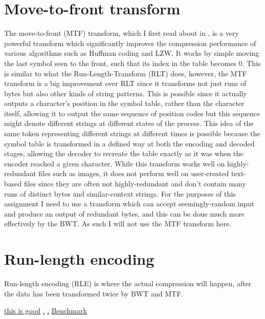 \documentclass[a4paper, 11pt]{article}
\numberwithin{equation}{section}
\theoremstyle{plain}
\theoremstyle{definition}
\begin{document}
\section{Move-to-front transform}
The move-to-front (MTF) transform, which I first read about in \cite{GoogleCompression}, 
is a very powerful transform which significantly improves the compression performance of 
various algorithms such as Huffman coding and LZW. 
It works by simple moving the last symbol seen to the front, such that its index in the table becomes 0. 
This is similar to what the Run-Length-Transform (RLT) does, however, the MTF transform 
is a big improvement over RLT since it transforms not just runs of bytes but also other kinds of 
string patterns. 
This is possible since it actually outputs a character's position in the symbol table, rather than the 
character itself, allowing it to output the same sequence of position codes but this sequence might denote 
different strings at different states of the process. 
This idea of the same token representing different strings at different times is possible because 
the symbol table is transformed in a defined way at both the encoding and decoded stages, allowing 
the decoder to recreate the table exactly as it was when the encoder reached a given character. 
While this transform works well on highly-redundant files such as images, 
it does not perform well on user-created text-based files since they are often not highly-redundant 
and don't contain many runs of distinct bytes and similar-context strings. 
For the purposes of this assignment I need to use a transform which can accept seemingly-random input 
and produce an output of redundant bytes, and this can be done much more effectively by the BWT. 
As such I will not use the MTF transform here.


\section{Run-length encoding}
Run-length encoding (RLE) is where the actual compression will happen, after the data has been transformed twice by 
BWT and MTF.

\href{https://sites.google.com/site/datacompressionguide/}{this is good}
\href{https://en.wikipedia.org/wiki/PAQ}{.}
\href{https://tarsa.github.io/lossless-benchmark/}{.}
\href{https://www.mattmahoney.net/dc/text.html}{Benchmark}





\end{document}
